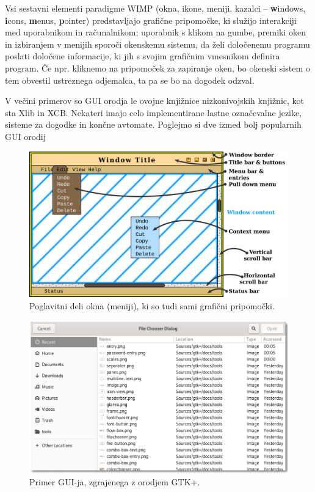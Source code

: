 \documentclass{article}
\begin{document}
Vsi sestavni elementi paradigme WIMP \autocite{wikiwindowingsystem, stackwindowingsystem} (okna, ikone, meniji, kazalci -- \textbf{w}indows, \textbf{i}cons, \textbf{m}enus, \textbf{p}ointer) predstavljajo grafične pripomočke, ki služijo interakciji med uporabnikom in računalnikom; uporabnik s klikom na gumbe, premiki oken in izbiranjem v menijih sporoči okenskemu sistemu, da želi določenemu programu poslati določene informacije, ki jih s svojim grafičnim vmesnikom definira program. Če npr. kliknemo na pripomoček za zapiranje oken, bo okenski sistem o tem obvestil ustreznega odjemalca, ta pa se bo na dogodek odzval.

V večini primerov so GUI orodja le ovojne knjižnice nizkonivojskih knjižnic, kot sta Xlib in XCB. Nekateri imajo celo implementirane lastne označevalne jezike, sisteme za dogodke in končne avtomate. Poglejmo si dve izmed bolj popularnih GUI orodij

\begin{figure}[H]
    \centering
    \includegraphics[width=\linewidth]{Winwow_windowing_system}
    \caption{Poglavitni deli okna (meniji), ki so tudi sami grafični pripomočki. \autocite{fig:windowsystem}}
\end{figure}

\newpage

\begin{figure}
    \vspace*{10pt}
    \centering
    \includegraphics[width=0.8\linewidth]{filechooser}
    \caption{Primer GUI-ja, zgrajenega z orodjem GTK+. \autocite{fig:filechooser}}
\end{figure}
\
\end{document}
